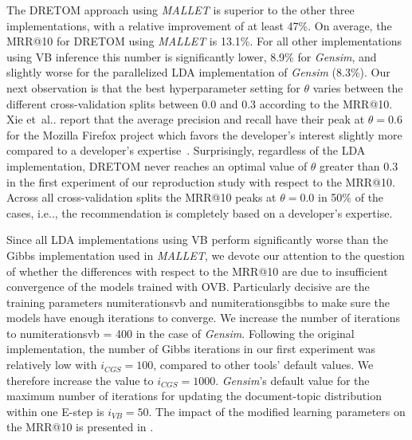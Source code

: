 \documentclass[a4paper,twoside]{article}
\makeatletter
\DeclareRobustCommand\onedot{\futurelet\@let@token\@onedot}
\def\@onedot{\ifx\@let@token.\else.\null\fi\xspace}
\def\etal{et~al\onedot}
\def\ie{i.e\onedot,\xspace}
\makeatother
\begin{document}
The \ac{DRETOM} approach using \textit{MALLET} is superior to the other three implementations, with a relative improvement of at least 47\%.
On average, the \ac{MRR}@10 for \ac{DRETOM} using \textit{MALLET} is 13.1\%.
For all other implementations using \ac{VB} inference this number is significantly lower, 8.9\% for \textit{Gensim}, and slightly worse for the parallelized \ac{LDA} implementation of \textit{Gensim} (8.3\%). %
Our next observation is that the best hyperparameter setting for $\theta$ varies between the different cross-validation splits between 0.0 and 0.3 according to the \ac{MRR}@10.
Xie \etal report that the average precision and recall have their peak at $\theta = 0.6$ for the Mozilla Firefox project which favors the developer's interest slightly more compared to a developer's expertise~\cite{xie2012dretom}.
Surprisingly, regardless of the \ac{LDA} implementation, \ac{DRETOM} never reaches an optimal value of $\theta$ greater than 0.3 in the first experiment of our reproduction study with respect to the \ac{MRR}@10.
Across all cross-validation splits the \ac{MRR}@10 peaks at $\theta = 0.0$ in 50\% of the cases, \ie the recommendation is completely based on a developer's expertise.

Since all \ac{LDA} implementations using \ac{VB} perform significantly worse than the Gibbs implementation used in \textit{MALLET}, we devote our attention to the question of whether the differences with respect to the \ac{MRR}@10 are due to insufficient convergence of the models trained with \ac{OVB}.
Particularly decisive are the training parameters \gls{numiterationsvb} and \gls{numiterationsgibbs} to make sure the models have enough iterations to converge.
We increase the number of iterations to \gls{numiterationsvb} = 400 in the case of \textit{Gensim}.
Following the original implementation, the number of Gibbs iterations in our first experiment was relatively low
with $i_{CGS}=100$, compared to other tools' default values. 
We therefore increase the value to $i_{CGS}=1000$.
\textit{Gensim}'s default value for the maximum number of iterations for updating the document-topic distribution within one E-step is $i_{VB}=50$.
The impact of the modified learning parameters on the \ac{MRR}@10 is presented in .
\end{document}
